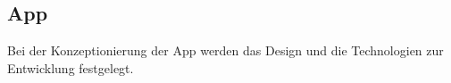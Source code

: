 \subsection{App}
Bei der Konzeptionierung der App werden das Design und die Technologien zur Entwicklung festgelegt.



\clearpage

